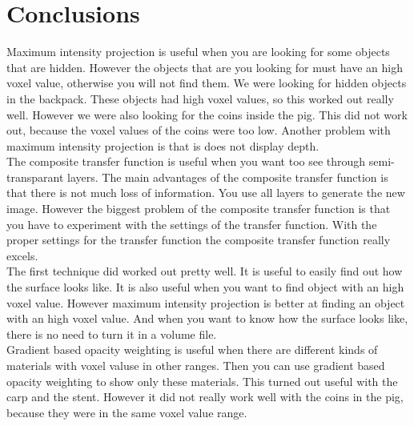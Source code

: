 \section{Conclusions}\label{Sec:Con}
Maximum intensity projection is useful when you are looking for some objects that are hidden.
However the objects that are you looking for must have an high voxel value, otherwise you will not find them.
We were looking for hidden objects in the backpack. 
These objects had high voxel values, so this worked out really well.
However we were also looking for the coins inside the pig.
This did not work out, because the voxel values of the coins were too low. 
Another problem with maximum intensity projection is that is does not display depth. \\
The composite transfer function is useful when you want too see through semi-transparant layers. 
The main advantages of the composite transfer function is that there is not much loss of information.
You use all layers to generate the new image. 
However the biggest problem of the composite transfer function is that you have to experiment with the settings of the transfer function.
With the proper settings for the transfer function the composite transfer function really excels. \\
The first technique did worked out pretty well. It is useful to easily find out how the surface looks like.
It is also useful when you want to find object with an high voxel value. 
However maximum intensity projection is better at finding an object with an high voxel value.
And when you want to know how the surface looks like, there is no need to turn it in a volume file. \\
Gradient based opacity weighting is useful when there are different kinds of materials with voxel valuse in other ranges.
Then you can use gradient based opacity weighting to show only these materials.
This turned out useful with the carp and the stent. 
However it did not really work well with the coins in the pig, because they were in the same voxel value range.



